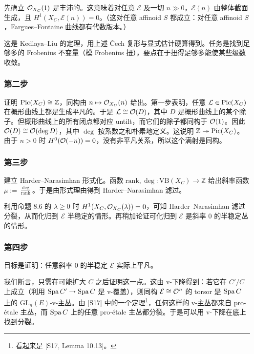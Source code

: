 先确立 $\mathcal{O}_{X_C}(1)$ 是丰沛的。这意味着对任意 $\mathcal{E}$ 及一切 $n\gg0$，$\mathcal{E}(n)$ 由整体截面生成，且 $H^1(X_C,\mathcal{E}(n))=0$。（这对任意 affinoid $S$ 都成立：对任意 affinoid $S$，Fargues--Fontaine 曲线都有代数版本。）

这是 Kedlaya--Liu 的定理，用上述 \v{C}ech 复形与显式估计硬算得到。任务是找到足够多的 Frobenius 不变量（模 Frobenius 扭），要点在于扭得足够多能使某些级数收敛。

\subsubsection{第二步}

证明 $\operatorname{Pic}(X_C)\cong\mathbb{Z}$，同构由 $n\mapsto\mathcal{O}_{X_C}(n)$ 给出。第一步表明，任意 $\mathcal{L}\in\operatorname{Pic}(X_C)$ 在概形曲线上都是生成平凡的。于是 $\mathcal{L}\cong\mathcal{O}(D)$，其中 $D$ 是概形曲线上的某个除子。但概形曲线上的所有闭点都对应 untilt，而它们的除子都同构于 $\mathcal{O}(1)$。因此 $\mathcal{O}(D)\cong\mathcal{O}(\deg D)$，其中 $\deg$ 按系数之和朴素地定义。这说明 $\mathbb{Z}\twoheadrightarrow\operatorname{Pic}(X_C)$。由于 $n>0$ 时 $H^0(\mathcal{O}(-n))=0$，没有非平凡关系，所以这个满射是同构。

\subsubsection{第三步}

建立 Harder--Narasimhan 形式化。函数 $\mathrm{rank},\deg\colon\mathrm{VB}(X_C)\to\mathbb{Z}$ 给出斜率函数 $\mu:=\frac{\deg}{\mathrm{rank}}$。于是由形式理由得到 Harder--Narasimhan 滤过。

利用命题 8.6 的 $\lambda\ge0$ 时 $H^1(X_C,\mathcal{O}_{X_C}(\lambda))=0$，可知 Harder--Narasimhan 滤过分裂，从而化归到 $\mathcal{E}$ 半稳定的情形。再稍加论证可化归到 $\mathcal{E}$ 是斜率 0 的半稳定丛的情形。

\subsubsection{第四步}

目标是证明：任意斜率 0 的半稳定 $\mathcal{E}$ 实际上平凡。

我们断言，只需在可能扩大 $C$ 之后证明这一点。这由 v-下降得到：若它在 $C'/C$ 上成立（利用 $\operatorname{Spa} C'\to\operatorname{Spa} C$ 是 v-覆盖），则同构 $\mathcal{E}\cong\mathcal{O}^n$ 的 torsor 是 $\operatorname{Spa} C$ 上的 $\mathrm{GL}_n(E)$-v-主丛。由 [S17] 中的一个定理\footnote{看起来是 [S17, Lemma 10.13]。}，任何这样的 v-主丛都来自 pro-étale 主丛，而 $\operatorname{Spa} C$ 上的任意 pro-étale 主丛都分裂。于是可以用 v-下降在底上找到分裂。

